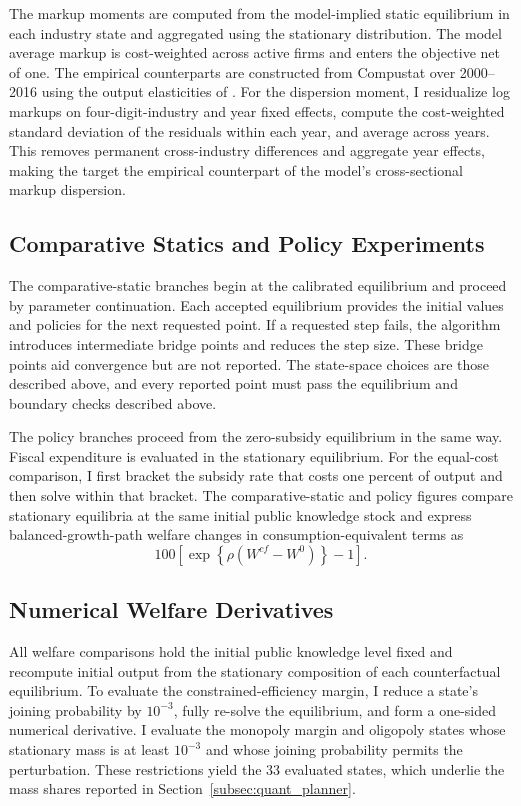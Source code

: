 \documentclass[12pt]{article}
\begin{document}
The markup moments are computed from the model-implied static equilibrium in each industry state and aggregated using the stationary distribution. The model average markup is cost-weighted across active firms and enters the objective net of one. The empirical counterparts are constructed from Compustat over 2000--2016 using the output elasticities of \citet{DeLoeckerEU20}. For the dispersion moment, I residualize log markups on four-digit-industry and year fixed effects, compute the cost-weighted standard deviation of the residuals within each year, and average across years. This removes permanent cross-industry differences and aggregate year effects, making the target the empirical counterpart of the model's cross-sectional markup dispersion.

\subsection{Comparative Statics and Policy Experiments}\label{app:discontinuities}

The comparative-static branches begin at the calibrated equilibrium and proceed by parameter continuation. Each accepted equilibrium provides the initial values and policies for the next requested point. If a requested step fails, the algorithm introduces intermediate bridge points and reduces the step size. These bridge points aid convergence but are not reported. The state-space choices are those described above, and every reported point must pass the equilibrium and boundary checks described above.

The policy branches proceed from the zero-subsidy equilibrium in the same way. Fiscal expenditure is evaluated in the stationary equilibrium. For the equal-cost comparison, I first bracket the subsidy rate that costs one percent of output and then solve within that bracket. The comparative-static and policy figures compare stationary equilibria at the same initial public knowledge stock and express balanced-growth-path welfare changes in consumption-equivalent terms as
\[
100\left[\exp\!\left\{\rho\left(W^{cf}-W^0\right)\right\}-1\right].
\]

\subsection{Numerical Welfare Derivatives}

All welfare comparisons hold the initial public knowledge level fixed and recompute initial output from the stationary composition of each counterfactual equilibrium. To evaluate the constrained-efficiency margin, I reduce a state's joining probability by \(10^{-3}\), fully re-solve the equilibrium, and form a one-sided numerical derivative. I evaluate the monopoly margin and oligopoly states whose stationary mass is at least \(10^{-3}\) and whose joining probability permits the perturbation. These restrictions yield the 33 evaluated states, which underlie the mass shares reported in Section~\ref{subsec:quant_planner}.
\end{document}
